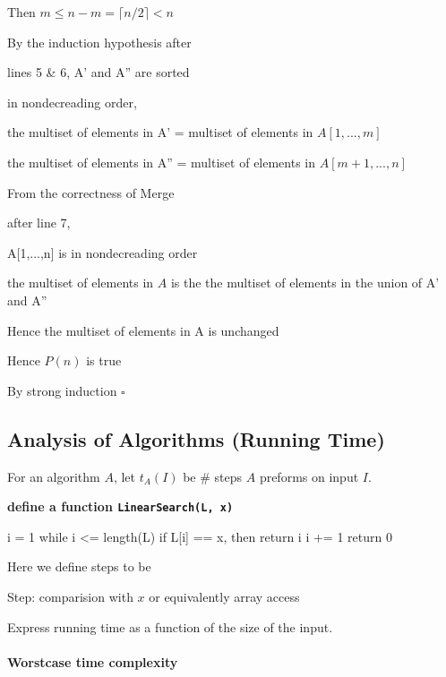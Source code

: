 \documentclass[
]{article}
\newenvironment{Shaded}{}{}
\newcommand{\NormalTok}[1]{#1}
\begin{document}
Then \(m\leq n-m =\lceil n/2\rceil < n\)

By the induction hypothesis after

lines 5 \& 6, A' and A'' are sorted

in nondecreading order,

the multiset of elements in A' = multiset of elements in \(A[1,...,m]\)

the multiset of elements in A'' = multiset of elements in
\(A[m+1,...,n]\)

From the correctness of Merge

after line 7,

A{[}1,...,n{]} is in nondecreading order

the multiset of elements in \(A\) is the the multiset of elements in the
union of A' and A''

Hence the multiset of elements in A is unchanged

Hence \(P(n)\) is true

By strong induction \(\square\)

\hypertarget{analysis-of-algorithms-running-time}{%
\subsection{Analysis of Algorithms (Running
Time)}\label{analysis-of-algorithms-running-time}}

For an algorithm \(A\), let \(t_A(I)\) be \# steps \(A\) preforms on
input \(I\).

\textbf{define a function \texttt{LinearSearch(L,\ x)}}

\begin{Shaded}
\begin{Highlighting}[]
\NormalTok{	i = 1}
\NormalTok{	while i \textless{}= length(L)}
\NormalTok{		if L[i] == x, then return i}
\NormalTok{		i += 1}
\NormalTok{	return 0}
\end{Highlighting}
\end{Shaded}

Here we define steps to be

Step: comparision with \(x\) or equivalently array access

Express running time as a function of the size of the input.

\hypertarget{worstcase-time-complexity}{%
\paragraph{Worstcase time complexity}\label{worstcase-time-complexity}}
\end{document}
